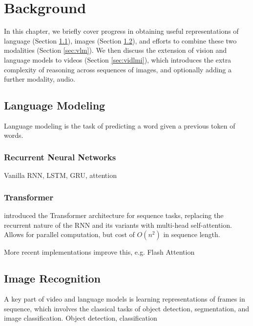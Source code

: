 
\chapter{Background}
\label{chap:bg}

In this chapter, we briefly cover progress in obtaining useful representations
of language (Section \ref{sec:lm}), images (Section \ref{sec:imrec}), and
efforts to combine these two modalities (Section \ref{sec:vlm}). We then
discuss the extension of vision and language models to videos (Section
\ref{sec:vidlmi}), which introduces the extra complexity of reasoning across
sequences of images, and optionally adding a further modality, audio. 

\section{Language Modeling}
\label{sec:lm}

Language modeling is the task of predicting a word given a previous token of words.

\subsection{Recurrent Neural Networks}
\label{ssec:rnn}

Vanilla RNN, LSTM, GRU, attention
	
\subsection{Transformer}
\label{ssec:transformer}

\cite{vaswani2017attention} introduced the Transformer architecture for sequence tasks, replacing the recurrent nature of the RNN and its variants with multi-head self-attention. Allows for parallel computation, but cost of $O(n^2)$ in sequence length.

More recent implementations improve this, e.g. Flash Attention

\section{Image Recognition}
\label{sec:imrec}

A key part of video and language models is learning representations of frames in sequence, which involves the classical tasks of object detection, segmentation, and image classification.
Object detection, classification

